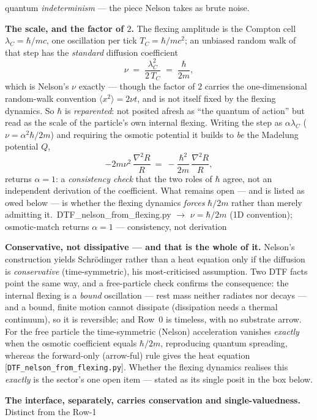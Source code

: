 \documentclass[11pt]{article}
\newcommand{\pychip}[2]{{\footnotesize\colorbox{cbPyBg}{\ttfamily\,#1\,}\,{\color{gray}$\to$ #2}}}
\begin{document}
quantum \emph{indeterminism} --- the piece Nelson takes as brute noise.
\par\smallskip
\textbf{The scale, and the factor of $2$.} The flexing amplitude is the Compton cell $\lambda_C=\hbar/mc$,
one oscillation per tick $T_C=\hbar/mc^2$; an unbiased random walk of that step has the \emph{standard}
diffusion coefficient
\[ \nu\;=\;\frac{\lambda_C^{2}}{2\,T_C}\;=\;\frac{\hbar}{2m}, \]
which is Nelson's $\nu$ exactly --- though the factor of $2$ carries the one-dimensional random-walk
convention $\langle x^2\rangle=2\nu t$, and is not itself fixed by the flexing dynamics. So $\hbar$ is
\emph{reparented}: not posited afresh as ``the quantum of action'' but read as the scale of the particle's
own internal flexing. Writing the step as $\alpha\lambda_C$ ($\nu=\alpha^2\hbar/2m$) and requiring the
osmotic potential it builds to \emph{be} the Madelung potential $Q$,
\[ -2m\nu^2\,\frac{\nabla^2 R}{R}\ =\ -\frac{\hbar^2}{2m}\,\frac{\nabla^2 R}{R}, \]
returns $\alpha=1$: a \emph{consistency check} that the two roles of $\hbar$ agree, not an independent
derivation of the coefficient. What remains open --- and is listed as owed below --- is whether the flexing
dynamics \emph{forces} $\hbar/2m$ rather than merely admitting it.
\pychip{DTF\_nelson\_from\_flexing.py}{$\nu=\hbar/2m$ (1D convention); osmotic-match returns $\alpha{=}1$ --- consistency, not derivation}
\par\smallskip
\textbf{Conservative, not dissipative --- and that is the whole of it.} Nelson's construction yields
Schr\"odinger rather than a heat equation only if the diffusion is \emph{conservative} (time-symmetric),
his most-criticised assumption. Two DTF facts point the same way, and a free-particle check confirms the
consequence: the internal flexing is a \emph{bound} oscillation --- rest mass neither radiates nor decays
--- and a bound, finite motion cannot dissipate (dissipation needs a thermal continuum), so it is
reversible; and Row~0 is timeless, with no substrate arrow. For the free particle the time-symmetric
(Nelson) acceleration vanishes \emph{exactly} when the osmotic coefficient equals $\hbar/2m$, reproducing
quantum spreading, whereas the forward-only (arrow-ful) rule gives the heat equation
[\texttt{DTF\_nelson\_from\_flexing.py}]. Whether the flexing dynamics realises this \emph{exactly} is the
sector's one open item --- stated as its single posit in the box below.
\par\smallskip
\textbf{The interface, separately, carries conservation and single-valuedness.} Distinct from the Row-1
\end{document}
